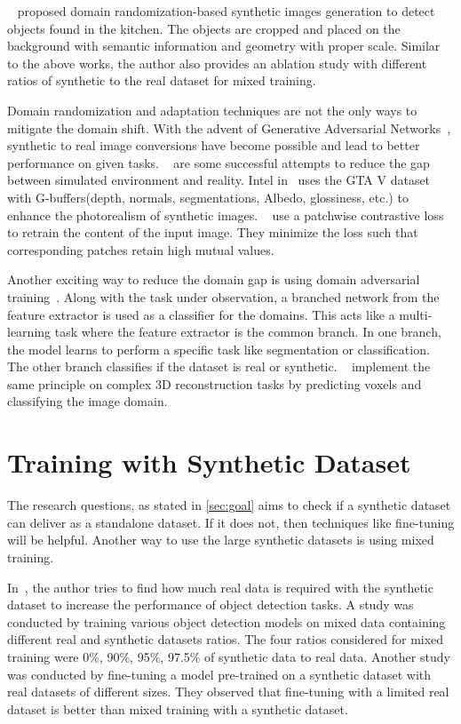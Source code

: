 ~\cite{georgakis2017synthesizing} proposed domain randomization-based synthetic images generation to detect objects found in the kitchen.
The objects are cropped and placed on the background with semantic information and geometry with proper scale.
Similar to the above works, the author also provides an ablation study with different ratios of synthetic to the real dataset for mixed training.

Domain randomization and adaptation techniques are not the only ways to mitigate the domain shift.
With the advent of Generative Adversarial Networks~\cite{Goodfellow2014}, synthetic to real image conversions have become possible and lead to better performance on given tasks.
~\cite{Richter_2021, CycleGAN2017, park2020cut,isola2017image, dundar2018domain,Wang2018HighResolutionIS} are some successful attempts to reduce the gap between simulated environment and reality.
Intel in~\cite{Richter_2021} uses the GTA V dataset with G-buffers(depth, normals, segmentations, Albedo, glossiness, etc.) to enhance the photorealism of synthetic images.
~\cite{park2020cut} use a patchwise contrastive loss to retrain the content of the input image.
They minimize the loss such that corresponding patches retain high mutual values.

Another exciting way to reduce the domain gap is using domain adversarial training~\cite{Ganin2017}.
Along with the task under observation, a branched network from the feature extractor is used as a classifier for the domains.
This acts like a multi-learning task where the feature extractor is the common branch.
In one branch, the model learns to perform a specific task like segmentation or classification.
The other branch classifies if the dataset is real or synthetic.
~\cite{Pinheiro2019} implement the same principle on complex 3D reconstruction tasks by predicting voxels and classifying the image domain.

\section{Training with Synthetic Dataset}\label{subsec:training-with-synthetic-dataset}
The research questions, as stated in \autoref{sec:goal} aims to check if a synthetic dataset can deliver as a standalone dataset.
If it does not, then techniques like fine-tuning will be helpful.
Another way to use the large synthetic datasets is using mixed training.

In~\cite{nowruzi2019real},  the author tries to find how much real data is required with the synthetic dataset to increase the performance of object detection tasks.
A study was conducted by training various object detection models on mixed data containing different real and synthetic datasets ratios.
The four ratios considered for mixed training were 0\%, 90\%, 95\%, 97.5\% of synthetic data to real data.
Another study was conducted by fine-tuning a model pre-trained on a synthetic dataset with real datasets of different sizes.
They observed that fine-tuning with a limited real dataset is better than mixed training with a synthetic dataset.

